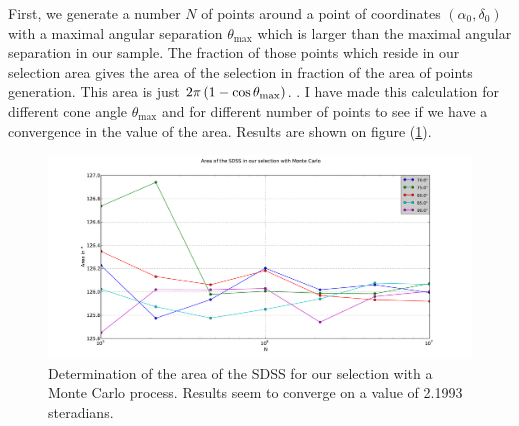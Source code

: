 First, we generate a number $N$ of points around a point of coordinates
$(\alpha_0, \delta_0)$ with a maximal angular separation $\theta_{\max}$ which
is larger than the maximal angular separation in our sample. The fraction of
those points which reside in our selection area gives the area of the selection
in fraction of the area of points generation. This area is just
$2\pi\left(1-\cos\theta_{\max}\right)$. . I have made this calculation for
different cone angle $\theta_{\max}$ and for different number of points
to see if we have a convergence in the value of the area. Results are shown on
figure (\ref{fig:sdss_area}).
\begin{figure}[htb]
    \centering
    \includegraphics[width=\linewidth]{SDSS_area}
    \caption{Determination of the area of the SDSS for our selection with a
    Monte Carlo process. Results seem to converge on a value of 2.1993
steradians.}
\label{fig:sdss_area}\end{figure}
